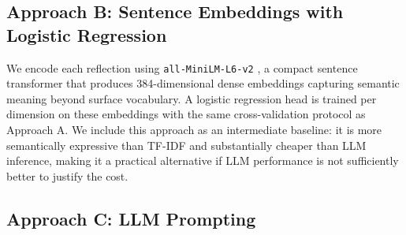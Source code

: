 \documentclass[11pt]{article}
\begin{document}

\subsection{Approach B: Sentence Embeddings with Logistic Regression}

We encode each reflection using \texttt{all-MiniLM-L6-v2} \citep{reimers2019sentence}, a compact sentence transformer that produces 384-dimensional dense embeddings capturing semantic meaning beyond surface vocabulary. A logistic regression head is trained per dimension on these embeddings with the same cross-validation protocol as Approach A. We include this approach as an intermediate baseline: it is more semantically expressive than TF-IDF and substantially cheaper than LLM inference, making it a practical alternative if LLM performance is not sufficiently better to justify the cost.


\subsection{Approach C: LLM Prompting}


\end{document}
